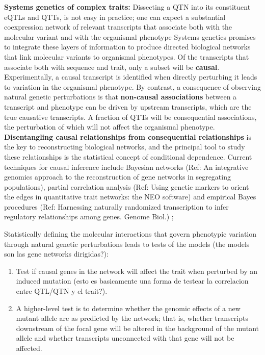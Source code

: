 \documentclass[a4paper,10pt]{article}
\begin{document}
\begin{description}
\textbf{Systems genetics of complex traits:} 
Dissecting a QTN into its constituent eQTLs and QTTs, is not easy in practice; one can expect a substantial coexpression network of relevant transcripts that associate both with the molecular variant and with the organismal phenotype
Systems genetics promises to integrate these layers of information to produce directed biological networks that link molecular variants to organismal phenotypes.
Of the transcripts that associate both with sequence and trait, only a subset will be \textbf{causal}. Experimentally, a causal transcript is identified when directly perturbing it leads to variation in the organismal phenotype. 
By contrast, a consequence of observing natural genetic perturbations is that \textbf{non-causal associations} between a transcript and phenotype can be driven by upstream transcripts, which are the true causative transcripts. 
A fraction of QTTs will be consequential associations, the perturbation of which will not affect the organismal phenotype. 
\textbf{Disentangling causal relationships from consequential relationships} is the key to reconstructing biological networks, and the principal tool to study these relationships is the statistical concept of conditional dependence.
Current techniques for causal inference include 
Bayesian networks (Ref: An integrative genomics approach to the reconstruction of gene networks in segregating populations), 
partial correlation analysis (Ref: Using genetic markers to orient the edges in quantitative trait networks: the NEO software) 
and empirical Bayes procedures (Ref: Harnessing naturally randomized transcription to infer regulatory relationships among genes. Genome Biol.) ;


Statistically defining the molecular interactions that govern phenotypic variation through natural genetic perturbations leads to tests of the models (the models son las gene networks dirigidas?):
\begin{enumerate}
 \item Test if causal genes in the network will affect the trait when perturbed by an induced mutation (esto es basicamente una forma de testear la correlacion entre QTL/QTN y el trait?).
 \item A higher-level test is to determine whether the genomic effects of a new mutant allele are as predicted by the network; 
 that is, whether transcripts downstream of the focal gene will be altered in the background of the mutant allele and whether transcripts unconnected with that gene will not be affected.
\end{enumerate}


\end{description}
\end{document}
